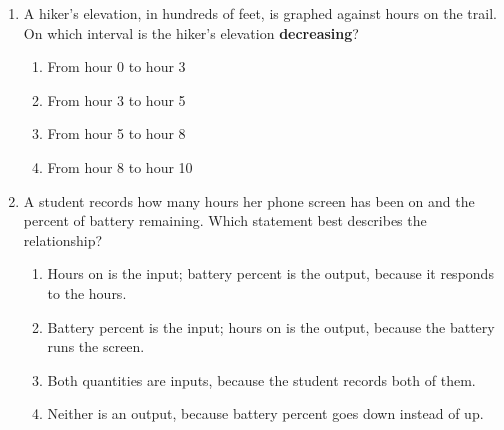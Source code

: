 \documentclass[10pt]{article}
\begin{document}
\begin{enumerate}[leftmargin=1.9em, itemsep=12pt]
\item \begin{minipage}[t]{0.52\linewidth}
      A hiker's elevation, in hundreds of feet, is graphed against hours on the trail. On which
      interval is the hiker's elevation \textbf{decreasing}?
      \begin{enumerate}[leftmargin=2.6em, itemsep=3pt]
        \item[(A)] From hour 0 to hour 3
        \item[(B)] From hour 3 to hour 5
        \item[(C)] From hour 5 to hour 8
        \item[(D)] From hour 8 to hour 10
      \end{enumerate}
      \end{minipage}\hfill
      \begin{minipage}[t]{0.44\linewidth}
      \vspace{-6pt}
      \centering
      \end{minipage}

\item A student records how many hours her phone screen has been on and the percent of battery
      remaining. Which statement best describes the relationship?
      \begin{enumerate}[leftmargin=2.6em, itemsep=2pt]
        \item[(A)] Hours on is the input; battery percent is the output, because it responds to the hours.
        \item[(B)] Battery percent is the input; hours on is the output, because the battery runs the screen.
        \item[(C)] Both quantities are inputs, because the student records both of them.
        \item[(D)] Neither is an output, because battery percent goes down instead of up.
      \end{enumerate}

\end{enumerate}
\end{document}
